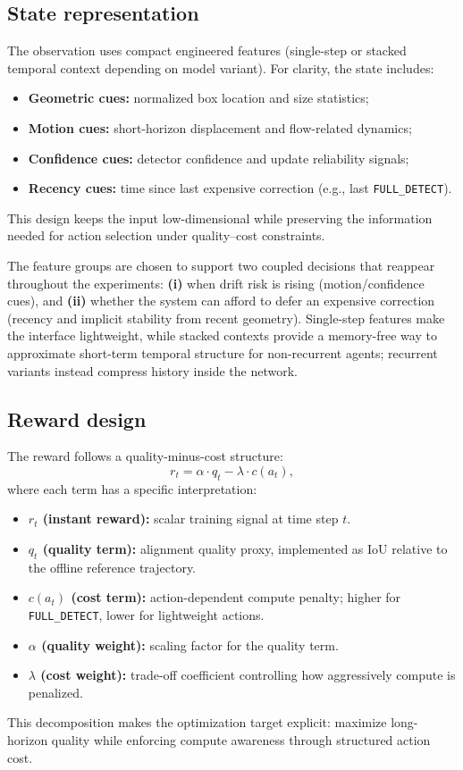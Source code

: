 \documentclass[letterpaper]{article}
\begin{document}
\subsection{State representation}
\label{sec:state}
The observation uses compact engineered features (single-step or stacked temporal context depending on model variant). For clarity, the state includes:
\begin{itemize}[leftmargin=1.2em]
    \item \textbf{Geometric cues:} normalized box location and size statistics;
    \item \textbf{Motion cues:} short-horizon displacement and flow-related dynamics;
    \item \textbf{Confidence cues:} detector confidence and update reliability signals;
    \item \textbf{Recency cues:} time since last expensive correction (e.g., last \texttt{FULL\_DETECT}).
\end{itemize}
This design keeps the input low-dimensional while preserving the information needed for action selection under quality--cost constraints.

The feature groups are chosen to support two coupled decisions that reappear throughout the experiments: \textbf{(i)} when drift risk is rising (motion/confidence cues), and \textbf{(ii)} whether the system can afford to defer an expensive correction (recency and implicit stability from recent geometry). Single-step features make the interface lightweight, while stacked contexts provide a memory-free way to approximate short-term temporal structure for non-recurrent agents; recurrent variants instead compress history inside the network.

\subsection{Reward design}
The reward follows a quality-minus-cost structure:
\begin{equation}
r_t = \alpha \cdot q_t - \lambda \cdot c(a_t),
\label{eq:reward}
\end{equation}
where each term has a specific interpretation:
\begin{itemize}[leftmargin=1.2em]
    \item \textbf{$r_t$ (instant reward):} scalar training signal at time step $t$.
    \item \textbf{$q_t$ (quality term):} alignment quality proxy, implemented as IoU relative to the offline reference trajectory.
    \item \textbf{$c(a_t)$ (cost term):} action-dependent compute penalty; higher for \texttt{FULL\_DETECT}, lower for lightweight actions.
    \item \textbf{$\alpha$ (quality weight):} scaling factor for the quality term.
    \item \textbf{$\lambda$ (cost weight):} trade-off coefficient controlling how aggressively compute is penalized.
\end{itemize}
This decomposition makes the optimization target explicit: maximize long-horizon quality while enforcing compute awareness through structured action cost.
\end{document}
